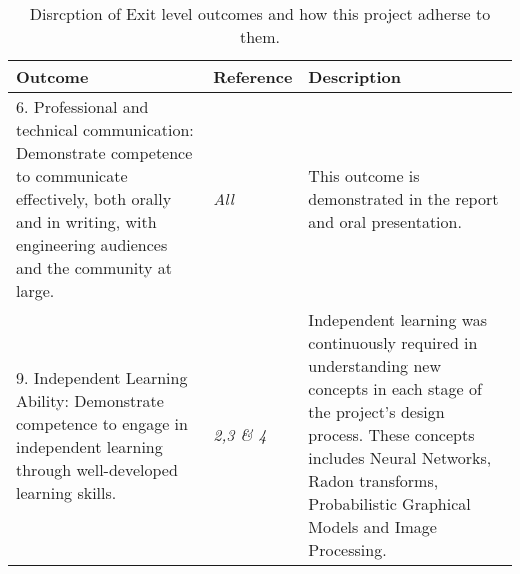 \begin{table}
\begin{tabular}{|p{6cm}|p{3cm}|p{6cm}|}
\hline
\textbf{Outcome}&\textbf{Reference}&\textbf{Description}\\
\hline
6. Professional and technical communication: Demonstrate competence to communicate effectively, both orally and
in writing, with engineering audiences and the community at large. & \textit{All}  &   This outcome is demonstrated in the report and oral presentation.       \\
\hline
9. Independent Learning Ability: Demonstrate competence to engage in independent learning through well-developed
learning skills.&\textit{2,3 \& 4}  &  Independent learning was continuously required in understanding new concepts in each stage of the project's design process. These concepts includes Neural Networks, Radon transforms, Probabilistic Graphical Models and Image Processing.\\
\hline
\end{tabular}
\caption{Disrcption of Exit level outcomes and how this project adherse to them.} \label{tbl:ECSATable2}
\end{table}

